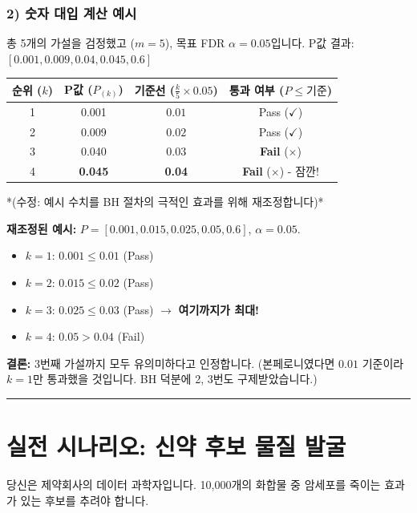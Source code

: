 \documentclass[11pt,a4paper]{book}
\theoremstyle{definition}
\begin{document}
\subsubsection*{2) 숫자 대입 계산 예시}
총 5개의 가설을 검정했고 ($m=5$), 목표 FDR $\alpha=0.05$입니다.
P값 결과: $[0.001, 0.009, 0.04, 0.045, 0.6]$

\begin{table}[h]
\centering
\begin{tabular}{c|c|c|c}
\toprule
\textbf{순위 ($k$)} & \textbf{P값 ($P_{(k)}$)} & \textbf{기준선 ($\frac{k}{5} \times 0.05$)} & \textbf{통과 여부 ($P \le \text{기준}$)} \\
\midrule
1 & 0.001 & $0.01$ & Pass ($\checkmark$) \\
2 & 0.009 & $0.02$ & Pass ($\checkmark$) \\
3 & 0.040 & $0.03$ & \textbf{Fail} ($\times$) \\
4 & \textbf{0.045} & \textbf{0.04} & \textbf{Fail} ($\times$) - 잠깐! \\
\bottomrule
\end{tabular}
\end{table}
*(수정: 예시 수치를 BH 절차의 극적인 효과를 위해 재조정합니다)*

\textbf{재조정된 예시:} $P = [0.001, 0.015, 0.025, 0.05, 0.6]$, $\alpha=0.05$.
\begin{itemize}
    \item $k=1$: $0.001 \le 0.01$ (Pass)
    \item $k=2$: $0.015 \le 0.02$ (Pass)
    \item $k=3$: $0.025 \le 0.03$ (Pass) $\rightarrow$ \textbf{여기까지가 최대!}
    \item $k=4$: $0.05 > 0.04$ (Fail)
\end{itemize}
\textbf{결론:} 3번째 가설까지 모두 유의미하다고 인정합니다. (본페로니였다면 $0.01$ 기준이라 $k=1$만 통과했을 것입니다. BH 덕분에 2, 3번도 구제받았습니다.)

\vspace{0.5cm}\hrule\vspace{0.5cm}

\section{실전 시나리오: 신약 후보 물질 발굴}

\begin{storybox}[title={Scenario: 수만 개의 화합물 스크리닝}]
당신은 제약회사의 데이터 과학자입니다. 10,000개의 화합물 중 암세포를 죽이는 효과가 있는 후보를 추려야 합니다.
\end{storybox}
\end{document}
